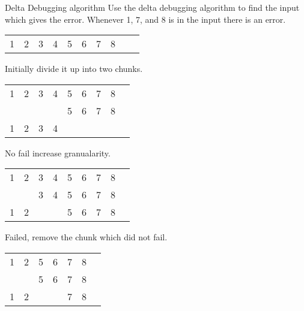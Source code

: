 \begin{exampleblock}{Delta Debugging algorithm}
    Use the delta debugging algorithm to find the input which gives the error.
    Whenever 1, 7, and 8 is in the input there is an error.
    \begin{center}
        \begin{tabular}{ c c c c c c c c c c}
         1 & 2 & 3 & 4 & 5 & 6 & 7 & 8 & & \\ 
        \end{tabular}
    \end{center}

    Initially divide it up into two chunks.
    \begin{center}
        \begin{tabular}{ c c c c|c c c c c}
         1 & 2 & 3 & 4 & 5 & 6 & 7 & 8 \\ 
         \color{lightgray}{1} & \color{lightgray}{2} & \color{lightgray}{3} & \color{lightgray}{4} & 5 & 6 & 7 & 8 & \color{green}{\checkmark} \\ 
         1 & 2 & 3 & 4 & \color{lightgray}{5} & \color{lightgray}{6} & \color{lightgray}{7} & \color{lightgray}{8} & \color{green}{\checkmark} \\ 
        \end{tabular}
    \end{center}

    No fail increase granualarity.
    \begin{center}
        \begin{tabular}{ c c|c c|c c|c c c}
         1 & 2 & 3 & 4 & 5 & 6 & 7 & 8 \\ 
         \color{lightgray}{1} & \color{lightgray}{2} & 3 & 4 & 5 & 6 & 7 & 8 & \color{green}{\checkmark} \\ 
         1 & 2 & \color{lightgray}{3} & \color{lightgray}{4} & 5 & 6 & 7 & 8 & \color{red}{x} \\ 
        \end{tabular}
    \end{center}

    Failed, remove the chunk which did not fail.
    \begin{center}
        \begin{tabular}{ c c|c c|c c c}
         1 & 2 & 5 & 6 & 7 & 8 \\ 
         \color{lightgray}{1} & \color{lightgray}{2} & 5 & 6 & 7 & 8 & \color{green}{\checkmark} \\ 
         1 & 2 & \color{lightgray}{5} & \color{lightgray}{6} & 7 & 8 & \color{red}{x} \\ 
        \end{tabular}
    \end{center}


\end{exampleblock}
